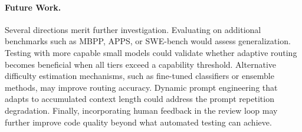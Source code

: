 \paragraph{Future Work.}
Several directions merit further investigation. Evaluating on additional benchmarks such as MBPP, APPS, or SWE-bench would assess generalization. Testing with more capable small models could validate whether adaptive routing becomes beneficial when all tiers exceed a capability threshold. Alternative difficulty estimation mechanisms, such as fine-tuned classifiers or ensemble methods, may improve routing accuracy. Dynamic prompt engineering that adapts to accumulated context length could address the prompt repetition degradation. Finally, incorporating human feedback in the review loop may further improve code quality beyond what automated testing can achieve.